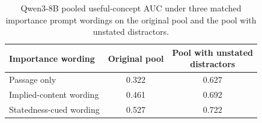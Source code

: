 \begin{table}[!htbp]
\centering
\caption{Qwen3-8B pooled useful-concept AUC under three matched importance prompt wordings on the original pool and the pool with unstated distractors.}
\label{tab:wording}
\small
\setlength{\tabcolsep}{3pt}
\begin{tabular}{@{}lcc@{}}
\toprule
Importance wording & Original pool & \shortstack{Pool with unstated\\distractors} \\
\midrule
Passage only & 0.322 & 0.627 \\
Implied-content wording & 0.461 & 0.692 \\
Statedness-cued wording & 0.527 & 0.722 \\
\bottomrule
\end{tabular}
\end{table}
